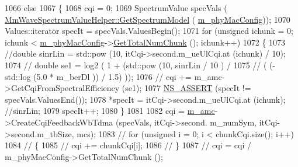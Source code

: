 \begin{DoxyCode}
1066                                 \textcolor{keywordflow}{else}
1067                                 \{
1068                                         cqi = 0;
1069                                         SpectrumValue specVals (
      \hyperlink{classns3_1_1MmWaveSpectrumValueHelper_a23fc6693b28bb565a97768b536225b58}{MmWaveSpectrumValueHelper::GetSpectrumModel} (
      \hyperlink{classns3_1_1MmWaveMacScheduler_a24d7af4971d2e500fe543cefbafa2fd9}{m\_phyMacConfig}));
1070                                         Values::iterator specIt = specVals.ValuesBegin();
1071                                         \textcolor{keywordflow}{for} (\textcolor{keywordtype}{unsigned} ichunk = 0; ichunk < 
      \hyperlink{classns3_1_1MmWaveMacScheduler_a24d7af4971d2e500fe543cefbafa2fd9}{m\_phyMacConfig}->\hyperlink{classns3_1_1MmWavePhyMacCommon_a97e82c809a351fea9d5058ac1bb4c3c6}{GetTotalNumChunk} (); ichunk++)
1072                                         \{
1073                                                 \textcolor{comment}{//double sinrLin = std::pow (10, itCqi->second.m\_ueUlCqi.at
       (ichunk) / 10);}
1074 \textcolor{comment}{//                                              double se1 = log2 ( 1 + (std::pow (10, sinrLin / 10 )  /}
1075 \textcolor{comment}{//                                                              ( (-std::log (5.0 * m\_berDl )) / 1.5) ));}
1076 \textcolor{comment}{//                                              cqi += m\_amc->GetCqiFromSpectralEfficiency (se1);}
1077                                                 \hyperlink{assert_8h_a6dccdb0de9b252f60088ce281c49d052}{NS\_ASSERT} (specIt != specVals.ValuesEnd());
1078                                                 *specIt = itCqi->second.m\_ueUlCqi.at (ichunk); \textcolor{comment}{//sinrLin;}
1079                                                 specIt++;
1080                                         \}
1081 
1082                                         cqi = \hyperlink{classns3_1_1MmWaveFlexTtiMacScheduler_a80d0b9fd279dd5c33c52cf0833d264da}{m\_amc}->CreateCqiFeedbackWbTdma (specVals, itCqi->second.
      m\_numSym, itCqi->second.m\_tbSize, mcs);
1083 \textcolor{comment}{//                                      for (unsigned i = 0; i < chunkCqi.size(); i++)}
1084 \textcolor{comment}{//                                      \{}
1085 \textcolor{comment}{//                                              cqi += chunkCqi[i];}
1086 \textcolor{comment}{//                                      \}}
1087 \textcolor{comment}{//                                      cqi = cqi / m\_phyMacConfig->GetTotalNumChunk ();}

\end{DoxyCode}
